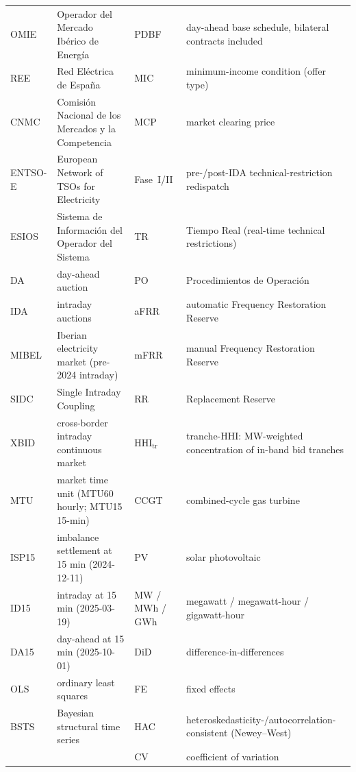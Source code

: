 \documentclass[11pt,a4paper]{article}
\theoremstyle{definition}
\theoremstyle{remark}
\theoremstyle{plain}
\begin{document}
\noindent\footnotesize
\begin{tabular}{@{}l p{}@{\hspace{0.7em}}l p{}@{}}
\toprule
OMIE      & Operador del Mercado Ib\'erico de Energ\'ia          & PDBF     & day-ahead base schedule, bilateral contracts included \\
REE       & Red El\'ectrica de Espa\~na                          & MIC      & minimum-income condition (offer type) \\
CNMC      & Comisi\'on Nacional de los Mercados y la Competencia & MCP      & market clearing price \\
ENTSO-E   & European Network of TSOs for Electricity             & Fase~I/II & pre-/post-IDA technical-restriction redispatch \\
ESIOS     & Sistema de Informaci\'on del Operador del Sistema    & TR       & Tiempo Real (real-time technical restrictions) \\
DA        & day-ahead auction                                    & PO       & Procedimientos de Operaci\'on \\
IDA       & intraday auctions                                    & aFRR     & automatic Frequency Restoration Reserve \\
MIBEL     & Iberian electricity market (pre-2024 intraday)       & mFRR     & manual Frequency Restoration Reserve \\
SIDC      & Single Intraday Coupling                             & RR       & Replacement Reserve \\
XBID      & cross-border intraday continuous market              & $\text{HHI}_{\text{tr}}$ & tranche-HHI: MW-weighted concentration of in-band bid tranches \\
MTU       & market time unit (MTU60 hourly; MTU15 15-min)        & CCGT     & combined-cycle gas turbine \\
ISP15     & imbalance settlement at 15 min (2024-12-11)          & PV       & solar photovoltaic \\
ID15      & intraday at 15 min (2025-03-19)                      & MW / MWh / GWh & megawatt / megawatt-hour / gigawatt-hour \\
DA15      & day-ahead at 15 min (2025-10-01)                     & DiD      & difference-in-differences \\
OLS       & ordinary least squares                               & FE       & fixed effects \\
BSTS      & Bayesian structural time series                      & HAC      & heteroskedasticity-/autocorrelation-consistent (Newey--West) \\
          &                                                      & CV       & coefficient of variation \\
\bottomrule
\end{tabular}\normalsize
\end{document}
